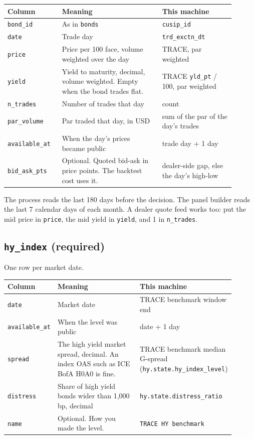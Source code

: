 \documentclass[10.5pt,a4paper]{article}
\newcommand{\code}[1]{\texttt{\small #1}}
\begin{document}
\begin{longtable}{@{}>{\raggedright\arraybackslash}p{0.198\linewidth}>{\raggedright\arraybackslash}p{0.405\linewidth}>{\raggedright\arraybackslash}p{0.297\linewidth}@{}}
\toprule
\textbf{Column} & \textbf{Meaning} & \textbf{This machine}\\
\midrule
\endhead
\code{bond\_\allowbreak{}id} & As in \code{bonds} & \code{cusip\_\allowbreak{}id}\\
\code{date} & Trade day & \code{trd\_\allowbreak{}exctn\_\allowbreak{}dt}\\
\code{price} & Price per 100 face, volume weighted over the day & TRACE, par weighted\\
\code{yield} & Yield to maturity, decimal, volume weighted. Empty when the bond trades flat. & TRACE \code{yld\_\allowbreak{}pt} / 100, par weighted\\
\code{n\_\allowbreak{}trades} & Number of trades that day & count\\
\code{par\_\allowbreak{}volume} & Par traded that day, in USD & sum of the par of the day's trades\\
\code{available\_\allowbreak{}at} & When the day's prices became public & trade day + 1 day\\
\code{bid\_\allowbreak{}ask\_\allowbreak{}pts} & Optional. Quoted bid-ask in price points. The backtest cost uses it. & dealer-side gap, else the day's high-low\\
\bottomrule
\end{longtable}

The process reads the last 180 days before the decision. The panel builder reads the last 7 calendar days of each month. A dealer quote feed works too: put the mid price in \code{price}, the mid yield in \code{yield}, and 1 in \code{n\_\allowbreak{}trades}.

\subsection{\code{hy\_\allowbreak{}index} (required)}

One row per market date.

\begin{longtable}{@{}>{\raggedright\arraybackslash}p{0.198\linewidth}>{\raggedright\arraybackslash}p{0.405\linewidth}>{\raggedright\arraybackslash}p{0.297\linewidth}@{}}
\toprule
\textbf{Column} & \textbf{Meaning} & \textbf{This machine}\\
\midrule
\endhead
\code{date} & Market date & TRACE benchmark window end\\
\code{available\_\allowbreak{}at} & When the level was public & date + 1 day\\
\code{spread} & The high yield market spread, decimal. An index OAS such as ICE BofA H0A0 is fine. & TRACE benchmark median G-spread (\code{hy.state.hy\_\allowbreak{}index\_\allowbreak{}level})\\
\code{distress} & Share of high yield bonds wider than 1,000 bp, decimal & \code{hy.state.distress\_\allowbreak{}ratio}\\
\code{name} & Optional. How you made the level. & \code{TRACE HY benchmark}\\
\bottomrule
\end{longtable}
\end{document}
